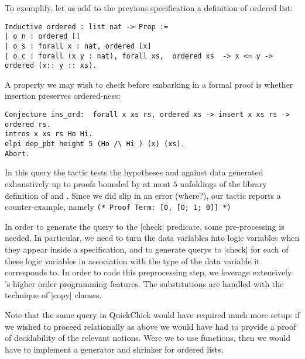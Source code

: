 To exemplify, let us add to the previous specification a definition of ordered list:
\begin{lstlisting}
Inductive ordered : list nat -> Prop :=
| o_n : ordered []
| o_s : forall x : nat, ordered [x]
| o_c : forall (x y : nat), forall xs,  ordered xs  -> x <= y -> ordered (x:: y :: xs).     
\end{lstlisting}
%
A property we may wish to check before embarking in a formal proof is whether insertion preserves ordered-ness:
\begin{lstlisting}
Conjecture ins_ord:  forall x xs rs, ordered xs -> insert x xs rs -> ordered rs.
intros x xs rs Ho Hi.
elpi dep_pbt height 5 (Ho /\ Hi ) (x) (xs).
Abort.
\end{lstlisting}
In this query the tactic tests the hypotheses  and 
against data  generated exhaustively up to proofs bounded
by at most $5$ unfoldings of the library  definition
of  and . Since we did slip in an error (where?), our
tactic reports a counter-example, namely
\verb|(* Proof Term: [0, [0; 1; 0]] *)|


In order to generate the query to the \lsti|check| predicate, some
pre-processing is needed. In particular, we need to turn the data
variables into \lP logic variables when they appear inside a
specification, and to generate querys to \lsti|check| for each of
these logic variables in association with the type of the data
variable it corresponds to.  In order to code this preprocessing step,
we leverage extensively \lP's higher order programming features. The
substitutions are handled with the technique of \lsti|copy| clauses.


Note that the same query in \textsf{QuickChick} would have required
much more setup: if we wished to proceed relationally as above we
would have had to provide a proof of decidability of the relevant
notions. Were we to use functions, then we would have to implement a
generator and shrinker for ordered lists.

